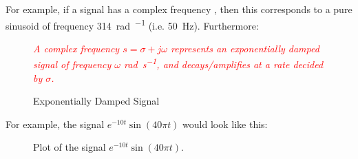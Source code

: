 \documentclass[a4paper,12pt]{report}
\begin{document}
\vspace{-1em}
\noindent For example, if a signal has a complex frequency  , then this corresponds to a pure sinusoid of frequency \SI{314}{\radian\per\sec} (i.e. \SI{50}{\hertz}). Furthermore:
\begin{figure}[H]
    \centering
    \begin{mdframed}
        \begin{center}
            \textcolor{red}{%
                \emph{A complex frequency \(s = \sigma + j\omega \) represents an exponentially
                    damped signal of frequency \(\omega \) \unit{\radian\per\second}, and decays/amplifies at a rate decided by \(\sigma \).}}
        \end{center}
    \end{mdframed}\label{fig:exp-damped-sinusoid-def-1}
    \vspace{-1em}\caption{Exponentially Damped Signal}
\end{figure}
\vspace{-1em}
\noindent For example, the signal \( e^{- 10t}\sin(40\pi t) \) would look like this:
\begin{figure}[H]
    \centering
    \vspace{-1em}\caption{Plot of the signal \(e^{-10t}\sin(40\pi t)\).}\label{fig:exp-damped-sinusoid-plot-1}
\end{figure}
\vspace{-1em}
\newpage
\end{document}
